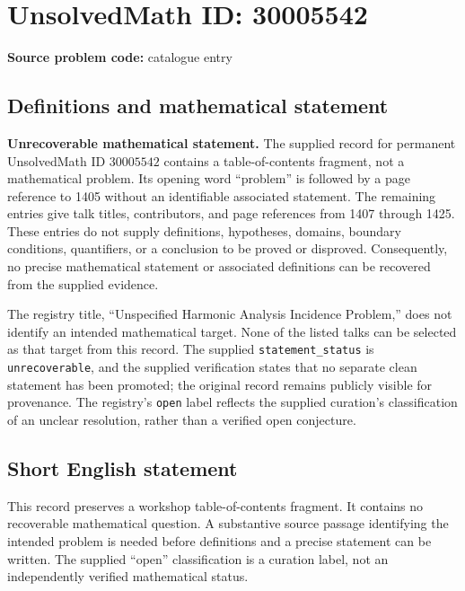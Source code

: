 \documentclass[11pt]{article}
\begin{document}
\section*{UnsolvedMath ID: 30005542}
\textbf{Source problem code:} catalogue entry
\subsection{Definitions and mathematical statement}
\textbf{Unrecoverable mathematical statement.} The supplied record for permanent UnsolvedMath ID \(30005542\) contains a table-of-contents fragment, not a mathematical problem. Its opening word ``problem'' is followed by a page reference to 1405 without an identifiable associated statement. The remaining entries give talk titles, contributors, and page references from 1407 through 1425. These entries do not supply definitions, hypotheses, domains, boundary conditions, quantifiers, or a conclusion to be proved or disproved. Consequently, no precise mathematical statement or associated definitions can be recovered from the supplied evidence.

The registry title, ``Unspecified Harmonic Analysis Incidence Problem,'' does not identify an intended mathematical target. None of the listed talks can be selected as that target from this record. The supplied \texttt{statement\_status} is \texttt{unrecoverable}, and the supplied verification states that no separate clean statement has been promoted; the original record remains publicly visible for provenance. The registry's \texttt{open} label reflects the supplied curation's classification of an unclear resolution, rather than a verified open conjecture.
\subsection{Short English statement}
This record preserves a workshop table-of-contents fragment. It contains no recoverable mathematical question. A substantive source passage identifying the intended problem is needed before definitions and a precise statement can be written. The supplied ``open'' classification is a curation label, not an independently verified mathematical status.
\end{document}
